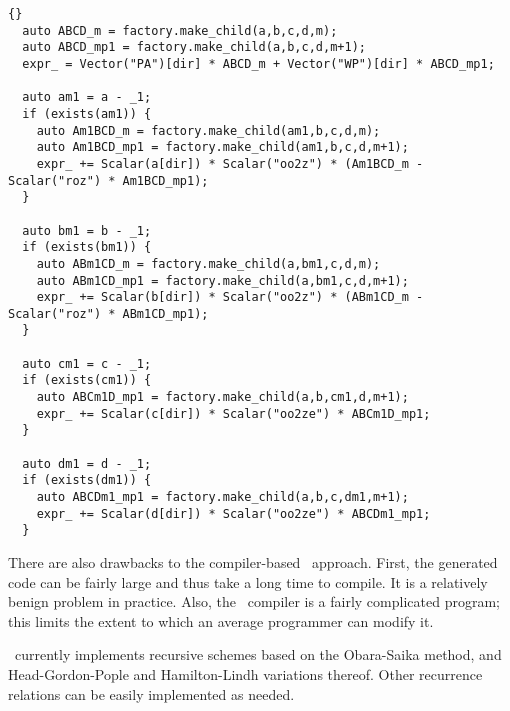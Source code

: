 \documentclass[10pt]{article}
\begin{document}
\begin{lstlisting}[label=lst:osrrcode,caption=Example specification of an
Obara-Saika recurrence relation in \LIBINT\ compiler (see {\tt
src/bin/libint2/vrr\_11\_twoprep\_11.h}).
The corresponding mathematical expression is shown in Eq. \eqref{eq:osvrrA}]{}
  auto ABCD_m = factory.make_child(a,b,c,d,m);
  auto ABCD_mp1 = factory.make_child(a,b,c,d,m+1);
  expr_ = Vector("PA")[dir] * ABCD_m + Vector("WP")[dir] * ABCD_mp1;
  
  auto am1 = a - _1;
  if (exists(am1)) {
    auto Am1BCD_m = factory.make_child(am1,b,c,d,m);
    auto Am1BCD_mp1 = factory.make_child(am1,b,c,d,m+1);
    expr_ += Scalar(a[dir]) * Scalar("oo2z") * (Am1BCD_m - Scalar("roz") * Am1BCD_mp1);
  }

  auto bm1 = b - _1;
  if (exists(bm1)) {
    auto ABm1CD_m = factory.make_child(a,bm1,c,d,m);
    auto ABm1CD_mp1 = factory.make_child(a,bm1,c,d,m+1);
    expr_ += Scalar(b[dir]) * Scalar("oo2z") * (ABm1CD_m - Scalar("roz") * ABm1CD_mp1);
  }

  auto cm1 = c - _1;
  if (exists(cm1)) {
    auto ABCm1D_mp1 = factory.make_child(a,b,cm1,d,m+1);
    expr_ += Scalar(c[dir]) * Scalar("oo2ze") * ABCm1D_mp1;
  }

  auto dm1 = d - _1;
  if (exists(dm1)) {
    auto ABCDm1_mp1 = factory.make_child(a,b,c,dm1,m+1);
    expr_ += Scalar(d[dir]) * Scalar("oo2ze") * ABCDm1_mp1;
  }
\end{lstlisting}

There are also drawbacks to the compiler-based \LIBINT\ approach. First, the
generated code can be fairly large and thus take a long time to compile.
It is a relatively benign problem in practice.
Also, the \LIBINT\ compiler is a fairly complicated program; this
limits the extent to which an average programmer can modify it.

\LIBINT\ currently implements recursive schemes based on the Obara-Saika method,\cite{Obara86, Obara88}
and Head-Gordon-Pople\cite{Head-Gordon88} and Hamilton-Lindh variations thereof.\cite{Hamilton91,Lindh91}
Other recurrence relations can be easily implemented as needed.
\end{document}
